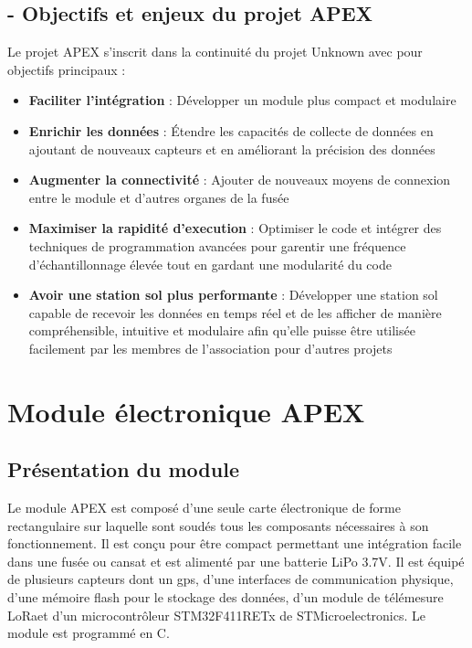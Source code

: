 \documentclass{article}
\begin{document}
\subsection*{- Objectifs et enjeux du projet APEX}
Le projet APEX s'inscrit dans la continuité du projet Unknown avec pour objectifs
principaux :
\begin{itemize}
    \item \textbf{Faciliter l'intégration} : Développer un module plus compact et
    modulaire
    \item \textbf{Enrichir les données} : Étendre les capacités de collecte de données
    en ajoutant de nouveaux capteurs et en améliorant la précision des données
    \item \textbf{Augmenter la connectivité} : Ajouter de nouveaux moyens de connexion
    entre le module et d'autres organes de la fusée
    \item \textbf{Maximiser la rapidité d'execution} : Optimiser le code et intégrer des
    techniques de programmation avancées pour garentir une fréquence d'échantillonnage
    élevée tout en gardant une modularité du code
    \item \textbf{Avoir une station sol plus performante} : Développer une station sol
    capable de recevoir les données en temps réel et de les afficher de manière
    compréhensible, intuitive et modulaire afin qu'elle puisse être utilisée
    facilement par les membres de l'association pour d'autres projets
\end{itemize}

\newpage
\section{Module électronique APEX}

\subsection{Présentation du module}

Le module APEX est composé d'une seule carte électronique de forme rectangulaire sur
laquelle sont soudés tous les composants nécessaires à son fonctionnement. Il est conçu
pour être compact permettant une intégration facile dans une fusée ou cansat et est
alimenté par une batterie LiPo 3.7V. Il est équipé de plusieurs capteurs dont un gps,
d'une interfaces de communication physique, d'une mémoire flash pour le stockage des
données, d'un module de télémesure LoRa\texttrademark et d'un microcontrôleur
STM32F411RETx de STMicroelectronics. Le module est programmé en C.
\end{document}
